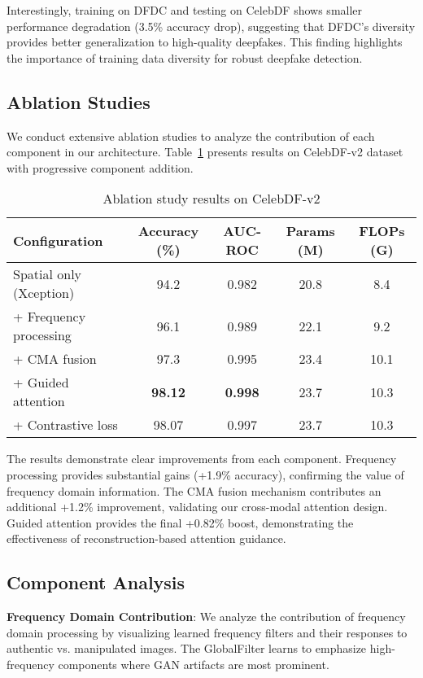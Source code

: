 \documentclass[letterpaper]{article} %
\begin{document}
Interestingly, training on DFDC and testing on CelebDF shows smaller performance degradation (3.5\% accuracy drop), suggesting that DFDC's diversity provides better generalization to high-quality deepfakes. This finding highlights the importance of training data diversity for robust deepfake detection.

\subsection{Ablation Studies}

We conduct extensive ablation studies to analyze the contribution of each component in our architecture. Table~\ref{tab:ablation} presents results on CelebDF-v2 dataset with progressive component addition.

\begin{table}[h]
\centering
\caption{Ablation study results on CelebDF-v2}
\label{tab:ablation}
\begin{tabular}{lcccc}
\toprule
Configuration & Accuracy (\%) & AUC-ROC & Params (M) & FLOPs (G) \\
\midrule
Spatial only (Xception) & 94.2 & 0.982 & 20.8 & 8.4 \\
+ Frequency processing & 96.1 & 0.989 & 22.1 & 9.2 \\
+ CMA fusion & 97.3 & 0.995 & 23.4 & 10.1 \\
+ Guided attention & \textbf{98.12} & \textbf{0.998} & 23.7 & 10.3 \\
+ Contrastive loss & 98.07 & 0.997 & 23.7 & 10.3 \\
\bottomrule
\end{tabular}
\end{table}

The results demonstrate clear improvements from each component. Frequency processing provides substantial gains (+1.9\% accuracy), confirming the value of frequency domain information. The CMA fusion mechanism contributes an additional +1.2\% improvement, validating our cross-modal attention design. Guided attention provides the final +0.82\% boost, demonstrating the effectiveness of reconstruction-based attention guidance.

\subsection{Component Analysis}

\textbf{Frequency Domain Contribution}: We analyze the contribution of frequency domain processing by visualizing learned frequency filters and their responses to authentic vs. manipulated images. The GlobalFilter learns to emphasize high-frequency components where GAN artifacts are most prominent.
\end{document}
